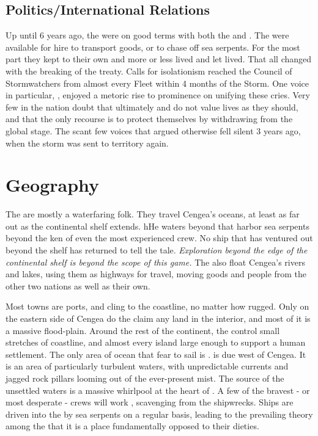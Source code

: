 \documentclass[blue]{GL2020}
\begin{document}
\subsection*{Politics/International Relations}
Up until 6 years ago, the \pShip{} were on good terms with both the \pFarm{} and \pTech{}. The \pShippies{} were available for hire to transport goods, or to chase off sea serpents. For the most part they kept to their own and more or less lived and let lived. That all changed with the breaking of the treaty. Calls for isolationism reached the Council of Stormwatchers from almost every Fleet within 4 months of the Storm. One voice in particular, \cLoud{}, enjoyed a metoric rise to prominence on unifying these cries. Very few in the nation doubt that ultimately \pFarm{} and \pTech{} do not value \pShip{} lives as they should, and that the only recourse is to protect themselves by withdrawing from the global stage. The scant few voices that argued otherwise fell silent 3 years ago, when the storm was sent to \pShip{} territory again.

\section*{Geography}
The \pShip{} are mostly a waterfaring folk. They travel Cengea's oceans, at least as far out as the continental shelf extends. hHe waters beyond that harbor sea serpents beyond the ken of even the most experienced \pShippies{} crew. No ship that has ventured out beyond the shelf has returned to tell the tale. \emph{Exploration beyond the edge of the continental shelf is beyond the scope of this game.} The \pShippies{} also float Cengea's rivers and lakes, using them as highways for travel, moving goods and people from the other two nations as well as their own.

Most \pShip{} towns are ports, and cling to the coastline, no matter how rugged. Only on the eastern side of Cengea do the \pShippies{} claim any land in the interior, and most of it is a massive flood-plain. Around the rest of the continent, the \pShip{} control small stretches of coastline, and almost every island large enough to support a human settlement. The only area of ocean that \pShippies{} fear to sail is \pWod{}. \pWod{} is due west of Cengea. It is an area of particularly turbulent waters, with unpredictable currents and jagged rock pillars looming out of the ever-present mist. The source of the unsettled waters is a massive whirlpool at the heart of \pWod{}. A few of the bravest - or most desperate - crews will work \pWod{}, scavenging from the shipwrecks. Ships are driven into the \pWod{} by sea serpents on a regular basis, leading to the prevailing theory among the \pShippies{} that it is a place fundamentally opposed to their dieties.
\end{document}
